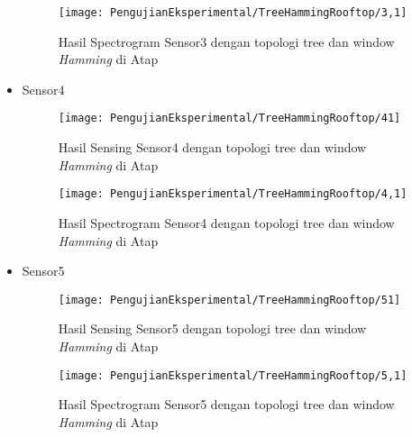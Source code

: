 \begin{itemize}
\begin{figure}[H]
	\centering
	\texttt{[image: PengujianEksperimental/TreeHammingRooftop/3,1]}
	\caption[Hasil Spectrogram Sensor3 dengan topologi tree dan window {\it Hamming} di Atap]{Hasil Spectrogram Sensor3 dengan topologi tree dan window {\it Hamming} di Atap} 
	\label{fig:hasilAtapTreeHamm3,1}
\end{figure}

\item Sensor4
\begin{figure}[H]
	\centering
	\texttt{[image: PengujianEksperimental/TreeHammingRooftop/41]}
	\caption[Hasil Sensing Sensor4 dengan topologi tree dan window {\it Hamming} di Atap]{Hasil Sensing Sensor4 dengan topologi tree dan window {\it Hamming} di Atap} 
	\label{fig:hasilAtapTreeHamm41}
\end{figure}

\begin{figure}[H]
	\centering
	\texttt{[image: PengujianEksperimental/TreeHammingRooftop/4,1]}
	\caption[Hasil Spectrogram Sensor4 dengan topologi tree dan window {\it Hamming} di Atap]{Hasil Spectrogram Sensor4 dengan topologi tree dan window {\it Hamming} di Atap} 
	\label{fig:hasilAtapTreeHamm4,1}
\end{figure}

\item Sensor5
\begin{figure}[H]
	\centering
	\texttt{[image: PengujianEksperimental/TreeHammingRooftop/51]}
	\caption[Hasil Sensing Sensor5 dengan topologi tree dan window {\it Hamming} di Atap]{Hasil Sensing Sensor5 dengan topologi tree dan window {\it Hamming} di Atap} 
	\label{fig:hasilAtapTreeHamm51}
\end{figure}

\begin{figure}[H]
	\centering
	\texttt{[image: PengujianEksperimental/TreeHammingRooftop/5,1]}
	\caption[Hasil Spectrogram Sensor5 dengan topologi tree dan window {\it Hamming} di Atap]{Hasil Spectrogram Sensor5 dengan topologi tree dan window {\it Hamming} di Atap} 
	\label{fig:hasilAtapTreeHamm5,1}
\end{figure}
\end{itemize}